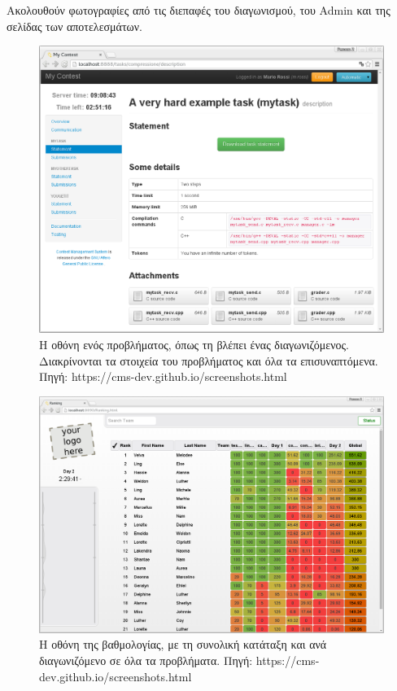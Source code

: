 \documentclass[diploma]{softlab-thesis}
\begin{document}
\bigskip

Ακολουθούν φωτογραφίες από τις διεπαφές του διαγωνισμού, του Admin και της σελίδας
των αποτελεσμάτων.

\bigskip

\begin{figure}
  \centering
  \includegraphics[scale=0.3,trim=4 4 4 4,clip]{Figures/cmscontestant.png}
  \caption[Οθόνη προβλήματος CMS]{Η οθόνη ενός προβλήματος, όπως τη βλέπει ένας
  διαγωνιζόμενος. Διακρίνονται τα στοιχεία του προβλήματος και όλα τα
  επισυναπτόμενα. Πηγή: https://cms-dev.github.io/screenshots.html}
\end{figure}

\begin{figure}
  \centering
  \includegraphics[scale=0.3,trim=4 4 4 4,clip]{Figures/cmsranking.png}
  \caption[Οθόνη βαθμολογιών CMS]{Η οθόνη της βαθμολογίας, με τη συνολική κατάταξη
  και ανά διαγωνιζόμενο σε όλα τα προβλήματα. Πηγή: https://cms-dev.github.io/screenshots.html}
\end{figure}
\end{document}
